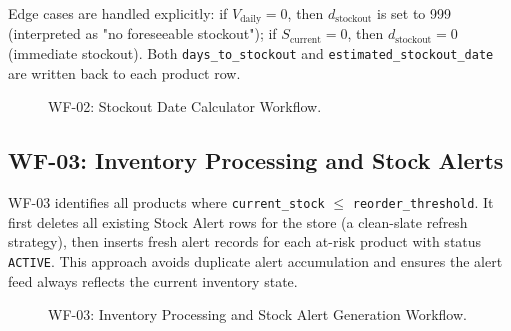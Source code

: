 Edge cases are handled explicitly: if $V_{\text{daily}} = 0$, then $d_{\text{stockout}}$ is set
to 999 (interpreted as "no foreseeable stockout"); if $S_{\text{current}} = 0$, then
$d_{\text{stockout}} = 0$ (immediate stockout). Both \texttt{days\_to\_stockout} and
\texttt{estimated\_stockout\_date} are written back to each product row.

\begin{figure}[H]
\centering
{}
\caption{WF-02: Stockout Date Calculator Workflow.}
\label{fig:wf02}
\end{figure}

\subsection{WF-03: Inventory Processing and Stock Alerts}

WF-03 identifies all products where \texttt{current\_stock} $\leq$ \texttt{reorder\_threshold}.
It first deletes all existing Stock Alert rows for the store (a clean-slate refresh strategy),
then inserts fresh alert records for each at-risk product with status \texttt{ACTIVE}. This
approach avoids duplicate alert accumulation and ensures the alert feed always reflects the
current inventory state.

\begin{figure}[H]
\centering
{}
\caption{WF-03: Inventory Processing and Stock Alert Generation Workflow.}
\label{fig:wf03}
\end{figure}

